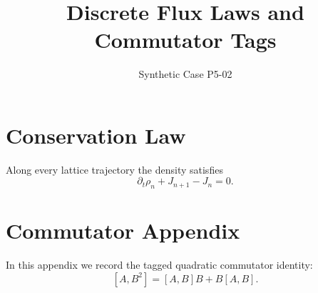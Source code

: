 \documentclass{article}
\title{Discrete Flux Laws and Commutator Tags}
\author{Synthetic Case P5-02}
\begin{document}
\maketitle

\section{Conservation Law}
\label{sec:conservation}

Along every lattice trajectory the density satisfies
\begin{equation}
\label{eq:flux-law}
\partial_t \rho_n + J_{n+1} - J_n = 0.
\end{equation}

\appendix
\section{Commutator Appendix}
\label{sec:appendix}

In this appendix we record the tagged quadratic commutator identity:
\begin{equation}
\label{eq:commutator-identity}
[A, B^2] = [A, B]B + B[A, B]. \tag{A1}
\end{equation}
\end{document}
